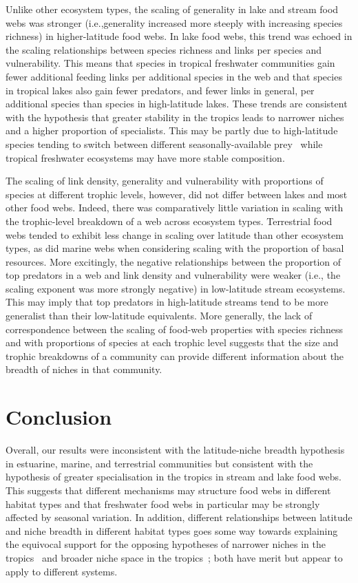 \documentclass[12pt]{article}
\begin{document}
  Unlike other ecosystem types, the scaling of generality in lake and stream
  food webs was stronger (i.e.,generality increased more steeply with
  increasing species richness) in higher-latitude food webs. In lake food webs,
  this trend was echoed in the scaling relationships between species richness
  and links per species and vulnerability. This means that species in tropical
  freshwater communities gain fewer additional feeding links per additional
  species in the web and that species in tropical lakes also gain fewer
  predators, and fewer links in general, per additional species than species
  in high-latitude lakes. These trends are consistent with the hypothesis that
  greater stability in the tropics leads to narrower
  niches~\citep{Vazquez2004} and a higher proportion of specialists. This may
  be partly due to high-latitude species tending to switch between different
  seasonally-available prey~\citep{Isaac2012,Wilhelm1999} while tropical
  freshwater ecosystems may have more stable composition.


  The scaling of link density, generality and vulnerability with proportions
  of species at different trophic levels, however, did not differ between lakes
  and most other food webs. Indeed, there was comparatively little variation in
  scaling with the trophic-level breakdown of a web across ecosystem types.
  Terrestrial food webs tended to exhibit less change in scaling over latitude
  than other ecosystem types, as did marine webs when considering scaling with
  the proportion of basal resources. More excitingly, the negative relationships
  between the proportion of top predators in a web and link density and
  vulnerability were weaker (i.e., the scaling exponent was more strongly
  negative) in low-latitude stream ecosystems. This may imply that top predators
  in high-latitude streams tend to be more generalist than their low-latitude equivalents.
  More generally, the lack of correspondence between the scaling of food-web
  properties with species richness and with proportions of species at each
  trophic level suggests that the size and trophic breakdowns of a community can
  provide different information about the breadth of niches in that community.

\section*{Conclusion}

  Overall, our results were inconsistent with the latitude-niche breadth
  hypothesis in estuarine, marine, and terrestrial communities but consistent
  with the hypothesis of greater specialisation in the tropics in stream and
  lake food webs. This suggests that different mechanisms may structure food
  webs in different habitat types and that freshwater food webs in particular
  may be strongly affected by seasonal variation. In addition, different
  relationships between latitude and niche breadth in different habitat types
  goes some way towards explaining the equivocal support for the opposing
  hypotheses of narrower niches in the tropics~\citep{Vazquez2004} and broader
  niche space in the tropics~\citep{Davies2007}; both have merit but appear to
  apply to different systems.
\end{document}
